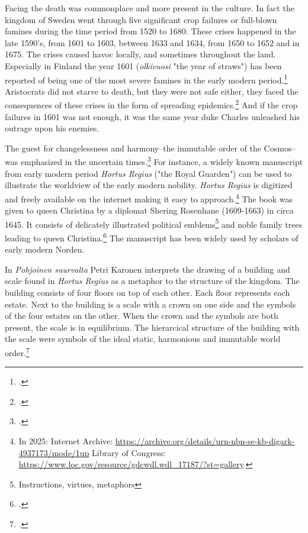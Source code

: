 Facing the death was commonplace and more present in the culture. In fact the kingdom of Sweden went through five significant crop failures or full-blown famines during the time period from 1520 to 1680. These crises happened in the late 1590's, from 1601 to 1603, between 1633 and 1634, from 1650 to 1652 and in 1675. The crises caused havoc locally, and sometimes throughout the land. Especially in Finland the year 1601 (\textit{olkivuosi} "the year of straws") has been reported of being one of the most severe famines in the early modern period.\footcite[pp. 9-11.]{dribeEtAll} Aristocrats did not starve to death, but they were not safe either, they faced the consequences of these crises in the form of spreading epidemics.\footcite[p. 159.]{lappalainen06} And if the crop failures in 1601 was not enough, it was the same year duke Charles unleashed his outrage upon his enemies.

The guest for changelessness and harmony–the immutable order of the Cosmos–was emphasized in the uncertain times.\footcite[p. 150.]{hakanenEtAll2020} For instance, a widely known manuscript from early modern period \textit{Hortus Regius} ("the Royal Guarden") can be used to illustrate the worldview of the early modern nobility. \textit{Hortus Regius} is digitized and freely available on the internet making it easy to approach.\footnote{In 2025: Internet Archive: \url{https://archive.org/details/urn-nbn-se-kb-digark-4937173/mode/1up} Library of Congress: \url{https://www.loc.gov/resource/gdcwdl.wdl\_17187/?st=gallery}.} The book was given to queen Christina by a diplomat Shering Rosenhane (1609-1663) in circa 1645. It consists of delicately illustrated political emblems\footnote{Instructions, virtues, metaphors} and noble family trees leading to queen Christina.\footcites{congresslibrary}[p. 271.]{BlennowAnna} The manuscript has been widely used by scholars of early modern Norden.

In \textit{Pohjoinen suurvalta} Petri Karonen interprets the drawing of a building and scale found in \textit{Hortus Regius} as a metaphor to the structure of the kingdom. The building consists of four floors on top of each other. Each floor represents each estate. Next to the building is a scale with a crown on one side and the symbols of the four estates on the other. When the crown and the symbols are both present, the scale is in equilibrium. The hierarcical structure of the building with the scale were symbols of the ideal static, harmonious and immutable world order.\footcite[pp. 162-165.]{pSuurvalta}

